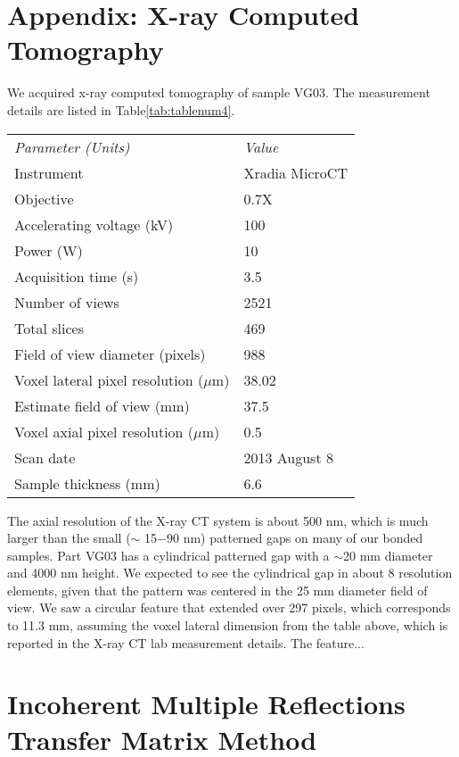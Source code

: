 \documentclass[osajnl,preprint,showpacs,superscriptaddress,12pt]{revtex4-1} %
\begin{document}
\appendix

\section{Appendix: X-ray Computed Tomography}
We acquired x-ray computed tomography of sample VG03.  The measurement details are listed in Table\ref{tab:tablenum4}.


\begin{center}
    \begin{tabular}{ll}
    \emph{Parameter (Units)} & \emph{Value} \\ 
    Instrument& Xradia MicroCT \\
     Objective & 0.7X \\
    Accelerating voltage (kV) & 100 \\
        Power (W) & 10 \\
        Acquisition time (s) & 3.5 \\
        Number of views & 2521 \\
        Total slices & 469 \\
        Field of view diameter (pixels) & 988 \\
        Voxel lateral pixel resolution ($\mu$m) & 38.02 \\
        Estimate field of view (mm) & 37.5 \\
        Voxel axial pixel resolution ($\mu$m) & 0.5 \\
        Scan date & 2013 August 8 \\
        Sample thickness (mm) & 6.6 \\
     \end{tabular}
\end{center}

The axial resolution of the X-ray CT system is about 500 nm, which is much larger than the small ($\sim$ 15$-$90 nm) patterned gaps on many of our bonded samples.  Part VG03 has a cylindrical patterned gap with a $\sim$20 mm diameter and 4000 nm height.  We expected to see the cylindrical gap in about 8 resolution elements, given that the pattern was centered in the 25 mm diameter field of view.  We saw a circular feature that extended over 297 pixels, which corresponds to 11.3 mm, assuming the voxel lateral dimension from the table above, which is reported in the X-ray CT lab measurement details.  The feature...


\section{Incoherent Multiple Reflections Transfer Matrix Method}
\label{sec:Append-IMRTMM}
\end{document}
